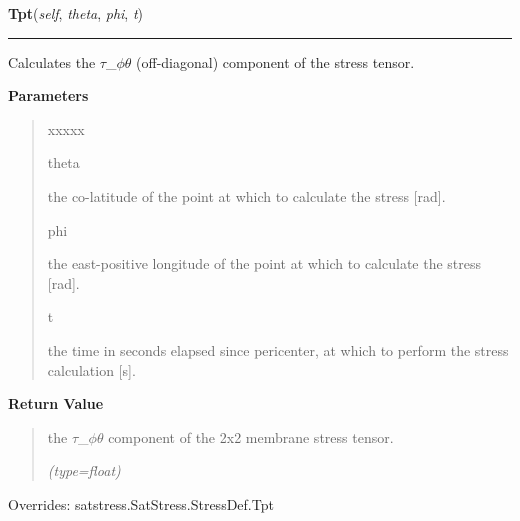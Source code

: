     \vspace{0.5ex}

\hspace{.8\funcindent}\begin{boxedminipage}{\funcwidth}

    \raggedright \textbf{Tpt}(\textit{self}, \textit{theta}, \textit{phi}, \textit{t})

    \vspace{-1.5ex}

    \rule{\textwidth}{0.5\fboxrule}
\setlength{\parskip}{2ex}
    Calculates the \(\tau\)\_\(\phi\)\(\theta\) (off-diagonal) component of
    the stress tensor.

\setlength{\parskip}{1ex}
      \textbf{Parameters}
      \vspace{-1ex}

      \begin{quote}
        \begin{Ventry}{xxxxx}

          \item[theta]

          the co-latitude of the point at which to calculate the stress 
          [rad].

          \item[phi]

          the east-positive longitude of the point at which to calculate 
          the stress [rad].

          \item[t]

          the time in seconds elapsed since pericenter, at which to perform
          the stress calculation [s].

        \end{Ventry}

      \end{quote}

      \textbf{Return Value}
    \vspace{-1ex}

      \begin{quote}
      the \(\tau\)\_\(\phi\)\(\theta\) component of the 2x2 membrane stress
      tensor.

      {\it (type=float)}

      \end{quote}

      Overrides: satstress.SatStress.StressDef.Tpt

    \end{boxedminipage}


